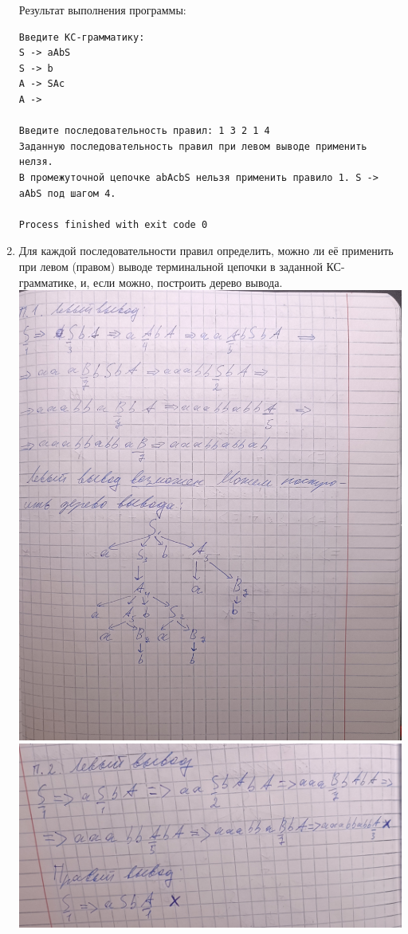 \documentclass[a4paper,14pt]{extarticle}
\begin{document}
\begin{enumerate}[1.]
\begin{verbatim}
          \end{verbatim}
          Результат выполнения программы:
          \begin{verbatim}
Введите КС-грамматику:
S -> aAbS
S -> b
A -> SAc
A -> 

Введите последовательность правил: 1 3 2 1 4
Заданную последовательность правил при левом выводе применить нелзя.
В промежуточной цепочке abAcbS нельзя применить правило 1. S -> aAbS под шагом 4.

Process finished with exit code 0
  \end{verbatim}





    \item Для каждой последовательности правил определить,
          можно ли её применить при левом (правом) выводе терминальной цепочки
          в заданной КС-грамматике, и, если можно, построить дерево вывода.\\
          \includegraphics[width=140mm]{task4_1}\\
          \includegraphics[width=140mm]{task4_2}\\

\end{enumerate}
\end{document}
